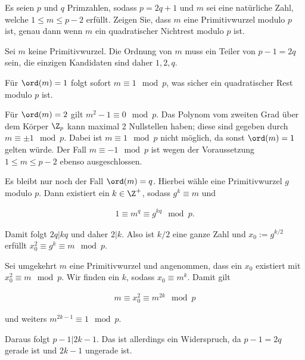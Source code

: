 
\begin{exercise}

Es seien $p$ und $q$ Primzahlen, sodass $p = 2q + 1$ und $m$ sei eine
natürliche Zahl, welche $1 \leq m \leq p - 2$ erfüllt.
Zeigen Sie, dass $m$ eine Primitivwurzel modulo $p$ ist, genau dann wenn
$m$ ein quadratischer Nichtrest modulo $p$ ist.

\end{exercise}


\begin{solution}

Sei $m$ keine Primitivwurzel. Die Ordnung von $m$ muss ein Teiler von $p - 1 = 2q$ 
sein, die einzigen Kandidaten sind daher $1,2,q$.

Für $\ord(m) = 1$ folgt sofort $m \equiv 1 \mod{p}$, was sicher ein quadratischer Rest modulo $p$ ist.

Für $\ord(m) = 2$ gilt $m^2 - 1 \equiv 0 \mod{p}$.
Das Polynom vom zweiten Grad über dem Körper $\Z_p$ kann maximal 2 Nullstellen
haben; diese sind gegeben durch $m \equiv \pm 1 \mod{p}$.
Dabei ist $m \equiv 1 \mod{p}$ nicht möglich, da sonst $\ord(m) = 1$ gelten würde.
Der Fall $m \equiv -1 \mod{p}$ ist wegen der Voraussetzung 
$1 \leq m \leq p - 2$ ebenso ausgeschlossen.

Es bleibt nur noch der Fall $\ord(m) = q$.
Hierbei wähle eine Primitivwurzel $g$ modulo $p$.
Dann existiert ein $k \in \Z^+$, sodass $g^k \equiv m$ und

\begin{align*}
    1 \equiv m^q \equiv g^{kq} \mod{p}.
\end{align*}

Damit folgt $2q | kq$ und daher $2|k$. Also ist $k/2$ eine ganze Zahl und
$x_0:= g^{k/2}$ erfüllt $x_0^2 \equiv g^k \equiv m \mod{p}$.

Sei umgekehrt $m$ eine Primitivwurzel und angenommen, dass 
ein $x_0$ existiert mit $x_0^2 \equiv m \mod{p}$.
Wir finden ein $k$, sodass $x_0 \equiv m^k$. Damit gilt

\begin{align*}
    m \equiv x_0^2 \equiv m^{2k} \mod{p}
\end{align*}

und weiters $m^{2k - 1} \equiv 1 \mod{p}$.

Daraus folgt $p - 1 | 2k - 1$. Das ist allerdings ein Widerspruch, da $p - 1 = 2q$
gerade ist und $2k - 1$ ungerade ist.

\end{solution}

